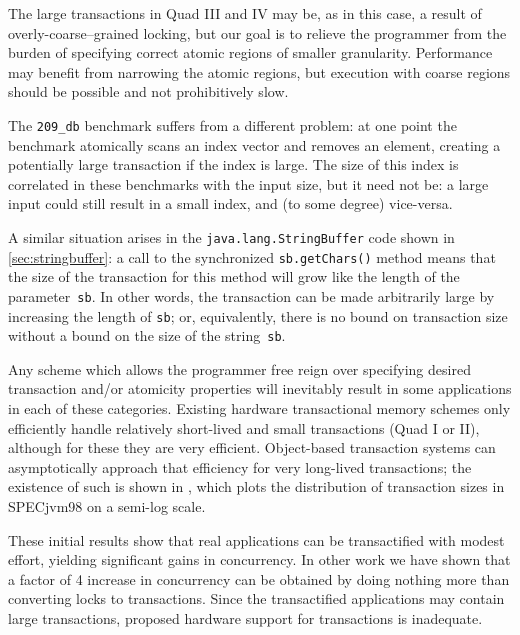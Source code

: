 The large transactions in Quad III and IV may be, as in this case, a result of
overly-coarse--grained locking, but our goal is to
relieve the programmer from the burden of specifying correct
atomic regions of smaller granularity.  Performance may benefit from
narrowing the atomic regions, but execution with coarse regions should
be possible and not prohibitively slow.

The \texttt{209\_db} benchmark suffers from a different problem: at one
point the benchmark atomically scans an index vector and removes an
element, creating a potentially large transaction if the index is
large.  The size of this index is correlated in these benchmarks with
the input size, but it need not be: a large input could still result
in a small index, and (to some degree) vice-versa.

A similar situation arises in the {\tt java.lang.StringBuffer} code
shown in \ref{sec:stringbuffer}:  a call to the synchronized
\texttt{sb.getChars()} method means that
the size of the transaction for this method will grow like the length
of the parameter~\texttt{sb}.  In other words, the transaction can be
made arbitrarily large by increasing the length of \texttt{sb}; or,
equivalently, there is no bound on transaction size without a bound on
the size of the string~\texttt{sb}.


Any scheme which allows the programmer free reign over specifying
desired transaction and/or atomicity properties will inevitably result
in some applications in each of these categories.  Existing
hardware transactional memory schemes only efficiently handle
relatively short-lived and small transactions (Quad I or II),
although for these they are very efficient.  Object-based
transaction systems can asymptotically approach that efficiency for
very long-lived transactions;  the existence of such is shown in
, which plots
the distribution of transaction sizes in SPECjvm98
on a semi-log scale.


\vspace*{5mm}

These initial results show that real applications can be
transactified with modest effort, yielding significant gains in
concurrency.  In other work \cite{AnanianAsKuLeLi04} we have shown
that a factor of 4 increase in concurrency can be obtained
by doing nothing more than converting locks to transactions.  Since
the transactified applications may contain large transactions,
proposed hardware support for transactions is inadequate.


